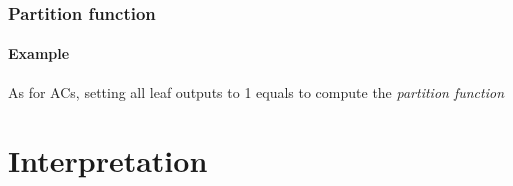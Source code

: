 \documentclass[10pt, t, xcolor={usenames,dvipsnames,svgnames}, compress]{beamer}
\begin{document}
\begin{frame}
\frametitle{Partition function}
\framesubtitle{Example}
As for ACs, setting all leaf outputs to 1 equals to compute the \emph{partition function} 

\begin{center}
\end{center}
\end{frame}


\section{Interpretation}
{
  \begin{frame}[c]
    \sectionpage
  \end{frame}
}
\end{document}
